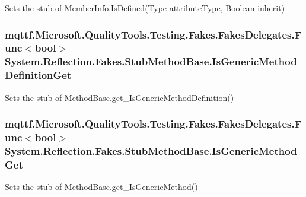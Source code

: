 Sets the stub of Member\-Info.\-Is\-Defined(\-Type attribute\-Type, Boolean inherit)

\hypertarget{class_system_1_1_reflection_1_1_fakes_1_1_stub_method_base_aeb6fe87e219ab243cf04b782b873fc30}{
\subsubsection[{Is\-Generic\-Method\-Definition\-Get}]{\setlength{\rightskip}{0pt plus 5cm}mqttf.\-Microsoft.\-Quality\-Tools.\-Testing.\-Fakes.\-Fakes\-Delegates.\-Func$<$bool$>$ System.\-Reflection.\-Fakes.\-Stub\-Method\-Base.\-Is\-Generic\-Method\-Definition\-Get}}\label{class_system_1_1_reflection_1_1_fakes_1_1_stub_method_base_aeb6fe87e219ab243cf04b782b873fc30}


Sets the stub of Method\-Base.\-get\-\_\-\-Is\-Generic\-Method\-Definition()

\hypertarget{class_system_1_1_reflection_1_1_fakes_1_1_stub_method_base_a425365d0f54d923fb17fc0b6cf806d0d}{
\subsubsection[{Is\-Generic\-Method\-Get}]{\setlength{\rightskip}{0pt plus 5cm}mqttf.\-Microsoft.\-Quality\-Tools.\-Testing.\-Fakes.\-Fakes\-Delegates.\-Func$<$bool$>$ System.\-Reflection.\-Fakes.\-Stub\-Method\-Base.\-Is\-Generic\-Method\-Get}}\label{class_system_1_1_reflection_1_1_fakes_1_1_stub_method_base_a425365d0f54d923fb17fc0b6cf806d0d}


Sets the stub of Method\-Base.\-get\-\_\-\-Is\-Generic\-Method()

